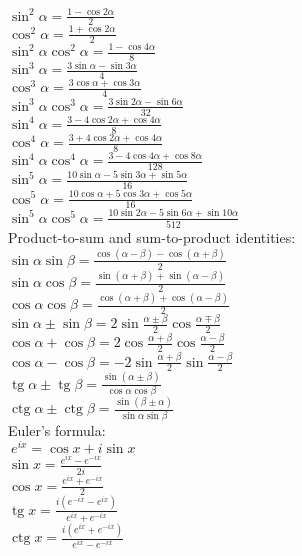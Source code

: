 \documentclass{letter}
\DeclareMathOperator{\tg}{tg}
\DeclareMathOperator{\ctg}{ctg}
\begin{document}
$\sin^2\alpha = \frac{1 - \cos 2\alpha}{2}$ \\
$\cos^2\alpha = \frac{1 + \cos 2\alpha}{2}$ \\
$\sin^2\alpha \cos^2\alpha = \frac{1 - \cos 4\alpha}{8}$ \\
$\sin^3\alpha = \frac{3 \sin\alpha - \sin 3\alpha}{4}$ \\
$\cos^3\alpha = \frac{3 \cos\alpha + \cos 3\alpha}{4}$ \\
$\sin^3\alpha \cos^3\alpha = \frac{3\sin 2\alpha - \sin 6\alpha}{32}$ \\
$\sin^4\alpha = \frac{3 - 4 \cos 2\alpha + \cos 4\alpha}{8}$ \\
$\cos^4\alpha = \frac{3 + 4 \cos 2\alpha + \cos 4\alpha}{8}$ \\
$\sin^4\alpha \cos^4\alpha = \frac{3-4\cos 4\alpha + \cos 8\alpha}{128}$ \\
$\sin^5\alpha = \frac{10 \sin\alpha - 5 \sin 3\alpha + \sin 5\alpha}{16}$ \\
$\cos^5\alpha = \frac{10 \cos\alpha + 5 \cos 3\alpha + \cos 5\alpha}{16}$ \\
$\sin^5\alpha \cos^5\alpha = \frac{10\sin 2\alpha - 5\sin 6\alpha + \sin 10\alpha}{512}$ \\

Product-to-sum and sum-to-product identities: \\

$ \sin  \alpha  \sin  \beta = \frac{ \cos ( \alpha - \beta) -  \cos ( \alpha + \beta)}{2} $ \\
$ \sin  \alpha  \cos  \beta = \frac{ \sin ( \alpha + \beta) +  \sin ( \alpha - \beta)}{2} $ \\
$ \cos  \alpha  \cos  \beta = \frac{ \cos ( \alpha + \beta) +  \cos ( \alpha - \beta)}{2} $ \\

$ \sin  \alpha \pm  \sin  \beta = 2 \sin \frac{ \alpha \pm \beta}{2} \cos \frac{ \alpha \mp \beta}{2}$ \\
$ \cos  \alpha + \cos  \beta = 2 \cos \frac{ \alpha + \beta}{2} \cos \frac{ \alpha - \beta}{2}$ \\
$ \cos  \alpha - \cos  \beta = - 2 \sin \frac{ \alpha + \beta}{2} \sin \frac{ \alpha - \beta}{2}$ \\
$ \tg  \alpha \pm \tg  \beta = \frac{ \sin ( \alpha \pm \beta)}{ \cos  \alpha \cos  \beta}$ \\
$ \ctg  \alpha \pm \ctg  \beta = \frac{ \sin ( \beta \pm \alpha)}{ \sin  \alpha \sin  \beta}$ \\

Euler's formula: \\

$~e^{ix}=\cos x+i\sin x$ \\
$\sin x=\frac{e^{ix}-e^{-ix}}{2i}$ \\
$\cos x=\frac{e^{ix}+e^{-ix}}{2}$ \\
$\tg x = \frac{i(e^{-ix}-e^{ix})}{e^{ix}+e^{-ix}}$ \\
$\ctg x = \frac{i(e^{ix}+e^{-ix})}{e^{ix}-e^{-ix}}$ \\
\end{document}
